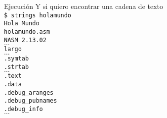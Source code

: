 \documentclass[aspectratio=169]{beamer}
\begin{document}
\begin{frame}[fragile,t]{Ejecución}
    \small
    \textcolor{verdeuca}{Y si quiero encontrar una cadena de texto}\\
    \pause
    \vspace{0.2cm}
    \verb|$ strings holamundo|\\
    \vspace{0.2cm}
    \pause
    \verb|Hola Mundo|\\
    \verb|holamundo.asm|\\
    \verb|NASM 2.13.02|\\
    \vspace{-0.1cm}
    $\dots$\\
    \vspace{0.1cm}
    \verb|largo|\\
    \vspace{-0.1cm}
    $\dots$\\
    \vspace{0.1cm}
    \verb|.symtab|\\
    \verb|.strtab|\\
    \vspace{-0.1cm}
    $\dots$\\
    \vspace{0.1cm}
    \verb|.text|\\
    \verb|.data|\\
    \verb|.debug_aranges|\\
    \verb|.debug_pubnames|\\
    \verb|.debug_info|\\
    \vspace{-0.1cm}
    $\dots$\\
    \vspace{0.1cm}
\end{frame}
\end{document}
